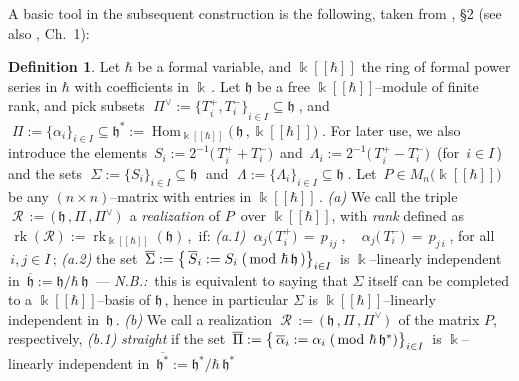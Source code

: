 \documentclass[12pt,reqno,twoside,a4paper]{amsart}
\numberwithin{equation}{section}
\theoremstyle{definition}
\newtheorem{definition}[lema]{Definition}
\newtheorem{free text}[lema]{}
\theoremstyle{remark}
\newcommand \rk{\operatorname{rk}}
\newcommand \Hom{\operatorname{Hom}}
\newcommand{\R}{{\mathcal R}}
\def \k {\Bbbk}
\def \kh{{\Bbbk[[\hbar]]}}
\def \lieh{\mathfrak{h}}
\theoremstyle{plain}
\begin{document}
\vskip7pt

  A basic tool in the subsequent construction is the following, taken from  \cite{GG3}, \S 2  (see also  \cite{Ka1}, Ch.\ 1):

\vskip11pt

\begin{definition}  \label{def: realization of P}
%
 Let  $ \hbar $  be a formal variable, and  $ \kh $  the ring of formal power series in  $ \hbar $
 with coefficients in  $ \k \, $.  Let  $ \lieh $  be a free  $ \kh $--module  of finite rank, and pick subsets
%
 $ \; \Pi^\vee := {\big\{ T^+_i , T^-_i \big\}}_{i \in I} \! \subseteq \lieh \; $,
%
 and
%
 $ \; \Pi := {\big\{ \alpha_i \big\}}_{i \in I} \subseteq \lieh^* := \Hom_\kh\!\big(\, \lieh \, , \kh \big) \; $.
%
 For later use, we also introduce the elements  $ \, S_i := 2^{-1} \big(\, T^+_i + T^-_i \big) \, $  and
 $ \,  \varLambda_i := 2^{-1} \big(\, T^+_i - T^-_i \big) \, $  (for  $ \, i \in I \, $)  and the sets
%
 $ \; \Sigma := {\big\{ S_i \big\}}_{i \in I} \! \subseteq \lieh \; $  and
 $ \; \Lambda := {\big\{ \varLambda_i \big\}}_{i \in I} \! \subseteq \lieh \; $.
%
 \vskip3pt
%
   Let  $ \, P \in M_n\big(\kh\big) \, $  be any  $ (n \times n) $--matrix  with entries in  $ \kh \, $.
%
 \vskip5pt
%
   \textit{(a)}\;  We call the triple  $ \; \R \, := \, \big(\, \lieh \, , \Pi \, , \Pi^\vee \,\big) \; $
   a  \textsl{realization\/}  of  $ P \, $ over $\kh$,
   with  \textsl{rank\/}  defined as  $ \, \rk(\R) := \rk_\kh(\lieh) \, $,  \,if:
%
 \vskip3pt
%
   \quad \textit{(a.1)} \;  $ \; \alpha_j\big(\,T^+_i\big) \, = \, p_{\,ij} \; $,
$ \;\;\; \alpha_j\big(\,T^-_i\big) \, = \, p_{j\,i} \; $,  \quad  for all  $ \, i, j \in I \, $;
%
 \vskip3pt
%
   \quad \textit{(a.2)} \;  the set  $ \, \overline{\Sigma} := {\big\{\, \overline{S}_i := S_i \; (\text{\,mod\ } \hbar\,\lieh \,) \big\}}_{i \in I} \, $
   is  $ \Bbbk $--linearly  independent in  $ \, \overline{\lieh} := \lieh \Big/ \hbar\,\lieh \, $   ---
   \textsl{N.B.:}\, this is equivalent to saying that  $ \Sigma $  itself can be completed to a  $ \kh $--basis  of  $ \lieh \, $,
   hence in particular  $ \Sigma $  is  $ \kh $--linearly  independent in  $ \, \lieh \, $.
%
 \vskip5pt
%
   \textit{(b)}\;  We call a realization  $ \; \R \, := \, \big(\, \lieh \, , \Pi \, , \Pi^\vee \,\big) \; $
   of the matrix  $ P $,  respectively,
%
 \vskip3pt
%
   \quad \textit{(b.1)} \;  \textsl{straight\/}  if the set  $ \, \overline{\Pi} := {\big\{\, \overline{\alpha}_i := \alpha_i \; (\text{\,mod\ } \hbar\,\lieh^* ) \big\}}_{i \in I}  \, $
   is  $ \Bbbk $--linearly  independent in  $ \, \overline{\lieh^*} := \lieh^* \Big/ \hbar\,\lieh^* \, $

\end{definition}
\end{document}
